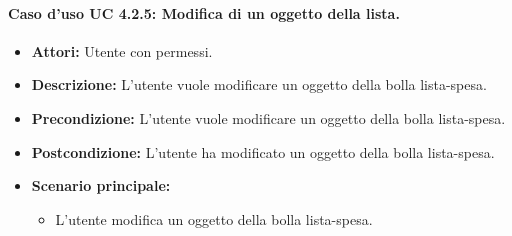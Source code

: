 \paragraph{Caso d'uso UC 4.2.5: Modifica di un oggetto della lista.}
\label{Caso d'uso UC 4.2.5: Modifica di un oggetto della lista.}

\FloatBarrier
\begin{itemize}
\item \textbf{Attori:} Utente con permessi.
\item \textbf{Descrizione:} L'utente vuole modificare un oggetto della bolla lista-spesa.
\item \textbf{Precondizione:} L'utente vuole modificare un oggetto della bolla lista-spesa. 
\item \textbf{Postcondizione:} L'utente ha modificato un oggetto della bolla lista-spesa.
\item \textbf{Scenario principale:}
	\begin{itemize}
	\item{L'utente modifica un oggetto della bolla lista-spesa.}
	\end{itemize}
\end{itemize}